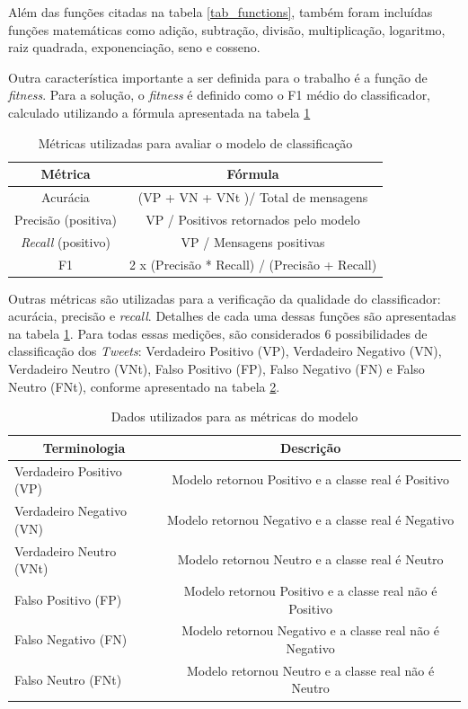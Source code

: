 \documentclass[12pt]{article}
\begin{document}
Além das funções citadas na tabela \ref{tab_functions}, também foram incluídas funções matemáticas como adição, subtração, divisão, multiplicação, logaritmo, raiz quadrada, exponenciação, seno e cosseno.

Outra característica importante a ser definida para o trabalho é a função de \emph{fitness}. Para a solução, o \emph{fitness} é definido como o F1 médio do classificador, calculado utilizando a fórmula apresentada na tabela \ref{metrics}

\begin{table}[H]
\centering
	\begin{tabular}{cc}
	\textbf{Métrica} & \textbf{Fórmula} \\ \hline
	Acurácia & (VP + VN + VNt )/ Total de mensagens \\ \hline
	Precisão (positiva) & VP / Positivos retornados pelo modelo \\ \hline
	\textit{Recall} (positivo) & VP / Mensagens positivas \\ \hline
	F1 & 2 x (Precisão * Recall) / (Precisão + Recall) \\ \hline
	\end{tabular}
	\caption{Métricas utilizadas para avaliar o modelo de classificação}
	\label{metrics}
\end{table}

Outras métricas são utilizadas para a verificação da qualidade do classificador: acurácia, precisão e \emph{recall}. Detalhes de cada uma dessas funções são apresentadas na tabela \ref{metrics}. Para todas essas medições, são considerados 6 possibilidades de classificação dos \emph{Tweets}: Verdadeiro Positivo (VP), Verdadeiro Negativo (VN), Verdadeiro Neutro (VNt), Falso Positivo (FP), Falso Negativo (FN) e Falso Neutro (FNt), conforme apresentado na tabela \ref{metricsTrueFalse}.

\begin{table}[H]
\centering
	\begin{tabular}{lc}
	\multicolumn{1}{c}{\textbf{Terminologia}} & \multicolumn{1}{c}{\textbf{Descrição}} \\ \hline
	Verdadeiro Positivo (VP) & Modelo retornou Positivo e a classe real é Positivo \\ \hline
	Verdadeiro Negativo (VN) & Modelo retornou Negativo e a classe real é Negativo \\ \hline
	Verdadeiro Neutro (VNt) & Modelo retornou Neutro e a classe real é Neutro \\ \hline
	Falso Positivo (FP) & Modelo retornou Positivo e a classe real não é Positivo \\ \hline
	Falso Negativo (FN) & Modelo retornou Negativo e a classe real não é Negativo \\ \hline
	Falso Neutro (FNt) & Modelo retornou Neutro e a classe real não é Neutro \\ \hline
	\end{tabular}
	\caption{Dados utilizados para as métricas do modelo}
	\label{metricsTrueFalse}
\end{table}
\end{document}
